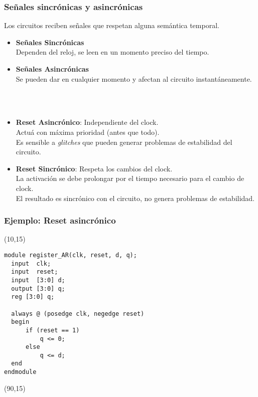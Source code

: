 \documentclass[aspectratio=169]{beamer}
\begin{document}
\begin{frame}[fragile,t]
    \frametitle{Señales sincrónicas y asincrónicas}
    Los circuitos reciben señales que respetan alguna semántica temporal.
    \begin{itemize}
    \item<2-> \textbf{Señales Sincrónicas}\\
    Dependen del reloj, se leen en un momento preciso del tiempo.
    \item<3-> \textbf{Señales Asincrónicas}\\
    Se pueden dar en cualquier momento y afectan al circuito instantáneamente.
    \end{itemize}
    \bigskip
    \\
    \\
    \begin{itemize}
    \item<5-> \textbf{Reset Asincrónico}: Independiente del clock.\\
    Actuá con máxima prioridad (antes que todo).\\
    \textcolor{verdeuca}{Es sensible a \emph{glitches} que pueden generar problemas de estabilidad del circuito.}
    \item<6-> \textbf{Reset Sincrónico}: Respeta los cambios del clock.\\
    La activación se debe prolongar por el tiempo necesario para el cambio de clock.\\
    \textcolor{verdeuca}{El resultado es sincrónico con el circuito, no genera problemas de estabilidad.}
    \end{itemize}
\end{frame}
   
\begin{frame}[fragile,t]
    \frametitle{Ejemplo: Reset asincrónico}
    \begin{textblock}{75}(10,15)
\begin{lstlisting}
module register_AR(clk, reset, d, q);
  input  clk;
  input  reset;
  input  [3:0] d;
  output [3:0] q;
  reg [3:0] q;
    
  always @ (posedge clk, negedge reset)
  begin
      if (reset == 1)
          q <= 0;
      else
          q <= d;
  end
endmodule
\end{lstlisting}
    \end{textblock}
    \begin{textblock}{60}(90,15)
    \\
    \bigskip
    \\
    \bigskip
    \end{textblock}
\end{frame}
\end{document}
